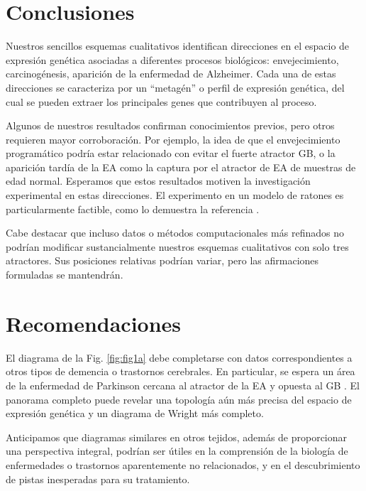 \chapter*{Conclusiones}\label{conclutions}
\onehalfspacing

Nuestros sencillos esquemas cualitativos identifican direcciones en el espacio de expresión genética asociadas a diferentes procesos biológicos: envejecimiento, carcinogénesis, aparición de la enfermedad de Alzheimer. Cada una de estas direcciones se caracteriza por un ``metagén'' o perfil de expresión genética, del cual se pueden extraer los principales genes que contribuyen al proceso.

Algunos de nuestros resultados confirman conocimientos previos, pero otros requieren mayor corroboración. Por ejemplo, la idea de que el envejecimiento programático podría estar relacionado con evitar el fuerte atractor GB, o la aparición tardía de la EA como la captura por el atractor de EA de muestras de edad normal. Esperamos que estos resultados motiven la investigación experimental en estas direcciones. El experimento en un modelo de ratones es particularmente factible, como lo demuestra la referencia \cite{hahn2023atlas}.

Cabe destacar que incluso datos o métodos computacionales más refinados no podrían modificar sustancialmente nuestros esquemas cualitativos con solo tres atractores. Sus posiciones relativas podrían variar, pero las afirmaciones formuladas se mantendrán.

\chapter*{Recomendaciones}\label{recomendations}



El diagrama de la Fig. \ref{fig:fig1a} debe completarse con datos correspondientes a otros tipos de demencia o trastornos cerebrales. En particular, se espera un área de la enfermedad de Parkinson cercana al atractor de la EA y opuesta al GB \cite{Mencke_2020}. El panorama completo puede revelar una topología aún más precisa del espacio de expresión genética y un diagrama de Wright más completo.

Anticipamos que diagramas similares en otros tejidos, además de proporcionar una perspectiva integral, podrían ser útiles en la comprensión de la biología de enfermedades o trastornos aparentemente no relacionados, y en el descubrimiento de pistas inesperadas para su tratamiento.
